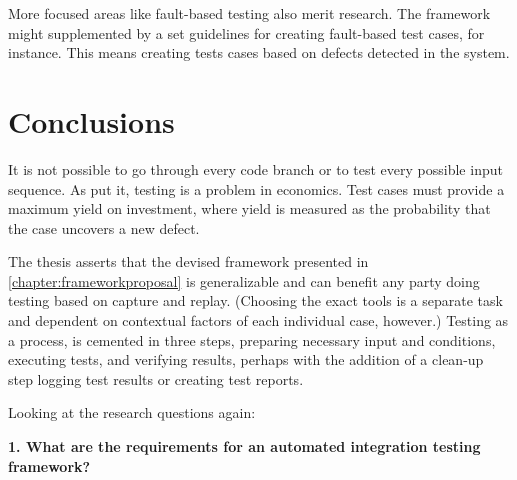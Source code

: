 \documentclass[12pt,a4paper,oneside,pdftex]{report}
\begin{document}
{More focused areas like fault-based testing also merit research. The framework might supplemented by a set guidelines for creating fault-based test cases, for instance. This means creating tests cases based on defects detected in the system.


\begin{comment}
Future research:
capture playback popular still despite warnings, what's up? when is it not applicable?
relationship between automation and manual work, test automation manual maintenance
integration test strategy in the vein if rehmann, what options/technical strategies are there? tired old big-bang
Strategies for test case creation (zeng & tan 2013)
study merits of fault based testing for more efficient tests
distinction between a technological configuration and process model is difficult.

notion of unit to system antiquated, block to block also
more an issue of test case construction and traceability
end-to-end tests are adequate if they can point to problem code accurately
\end{comment}

\chapter{Conclusions}
\label{chapter:conclusions}

It is not possible to go through every code branch or to test every possible input sequence. As \citet{myers1976software} put it, testing is a problem in economics. Test cases must provide a maximum yield on investment, where yield is measured as the probability that the case uncovers a new defect. \citep{myers1976software} 

The thesis asserts that the devised framework presented in \ref{chapter:frameworkproposal} is generalizable and can benefit any party doing testing based on capture and replay. (Choosing the exact tools is a separate task and dependent on contextual factors of each individual case, however.) Testing as a process, is cemented in three steps, preparing necessary input and conditions, executing tests, and verifying results, perhaps with the addition of a clean-up step logging test results or creating test reports.

Looking at the research questions again:

\begin{adjustwidth}{2.5em}{0pt}
\textbf{1. What are the requirements for an automated integration testing framework?} \\
\end{adjustwidth}

}
\end{document}
